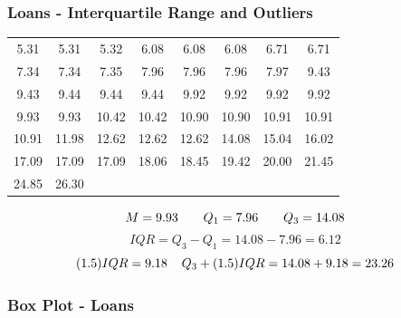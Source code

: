 \documentclass{beamer}
\begin{document}
\begin{frame}
  \frametitle{Loans - Interquartile Range and Outliers}
  \begin{table}
    \begin{tabular}{@{}cccccccc@{}}
      \toprule
      5.31 & 5.31 & 5.32 & 6.08 & 6.08 & 6.08 & 6.71 & 6.71 
      \\[0.3em]
      7.34 & 7.34 & 7.35 & 7.96 & 7.96 & 7.96 & 7.97 & 9.43 
      \\[0.3em]
      9.43 & 9.44 & 9.44 & 9.44 & 9.92 & 9.92 & 9.92 & 9.92 
      \\[0.3em]
      9.93 & 9.93 & 10.42 & 10.42 & 10.90 & 10.90 & 10.91 & 10.91 
      \\[0.3em]
      10.91 & 11.98 & 12.62 & 12.62 & 12.62 & 14.08 & 15.04 & 16.02
      \\[0.3em]
      17.09 & 17.09 & 17.09 & 18.06 & 18.45 & 19.42 & 20.00 & 21.45
      \\[0.3em]
      24.85 & 26.30 \\
      \bottomrule 
    \end{tabular}
  \end{table}
  \begin{equation*}
    M = 9.93 \hspace{0.7cm}
    Q_1 = 7.96 \hspace{0.7cm}
    Q_3 = 14.08
  \end{equation*}
  \begin{equation*}
    IQR = Q_3 - Q_1 = 14.08 - 7.96 = 6.12
  \end{equation*}
  \begin{equation*}
    (1.5) IQR = 9.18 \hspace{0.4cm}
    Q_3 + (1.5) IQR = 14.08 + 9.18 = 23.26
  \end{equation*}
\end{frame}

\begin{frame}
  \frametitle{Box Plot - Loans}
\end{frame}
\end{document}
